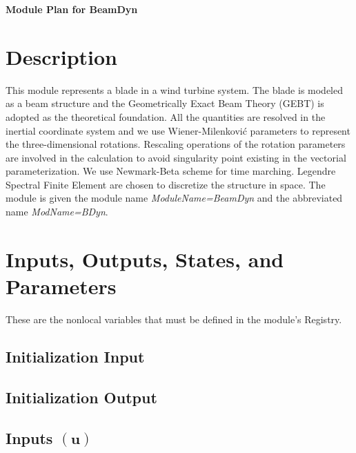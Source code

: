 \documentclass[11pt]{article}
\newcommand{\comm}[1]{\textcolor{blue}{\textit{#1}}}
\begin{document}
\begin{center}
{\large \textbf{Module Plan for BeamDyn}}
\end{center}


\section*{Description}

This module represents a blade in a wind turbine system. The blade is
modeled as a beam structure and the Geometrically Exact Beam Theory (GEBT)
is adopted as the theoretical foundation. All the quantities are resolved in
the inertial coordinate system and we use Wiener-Milenkovi\'{c} parameters
to represent the three-dimensional rotations. Rescaling operations of the
rotation parameters are involved in the calculation to avoid singularity
point existing in the vectorial parameterization. We use Newmark-Beta scheme
for time marching. Legendre Spectral Finite Element are chosen to discretize
the structure in space. The module is given the module name {\it
ModuleName=BeamDyn} and the abbreviated name {\it ModName=BDyn}.
 

\section*{Inputs, Outputs, States, and Parameters}

These are the nonlocal variables that must be defined in the module's
Registry.

\subsection*{Initialization Input}

\subsection*{Initialization Output}

\subsection*{Inputs $(\mathbf{u})$}


\end{document}
